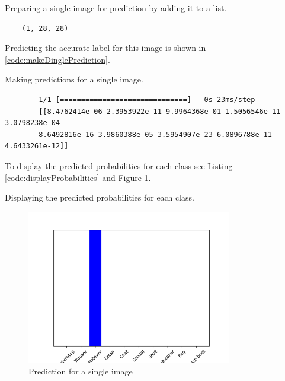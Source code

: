 \begin{code}[h!]
	    
	
	\caption{Preparing a single image for prediction by adding it to a list.}
	\label{code:prepareSingleImage}
\end{code}

\begin{verbatim}
	(1, 28, 28)
\end{verbatim}

Predicting the accurate label for this image is shown in \ref{code:makeDinglePrediction}.

\begin{code}[h!]
	    
	
	\caption{Making predictions for a single image.}
	\label{code:makeDinglePrediction}
\end{code}

{\footnotesize
	\begin{verbatim}
		1/1 [==============================] - 0s 23ms/step
		[[8.4762414e-06 2.3953922e-11 9.9964368e-01 1.5056546e-11 3.0798238e-04
		8.6492816e-16 3.9860388e-05 3.5954907e-23 6.0896788e-11 4.6433261e-12]]
	\end{verbatim}
}

To display the predicted probabilities for each class see Listing \ref{code:displayProbabilities} and Figure \ref{fig:singlePredictionPlot}.

\begin{code}[h!]
	    
	
	\caption{Displaying the predicted probabilities for each class.}
	\label{code:displayProbabilities}
\end{code}

\begin{figure}[h!]
	\centering
	\includegraphics[width=0.8\textwidth]{Images/TensorFlowPackage/singlePredictionPlot}
	\caption{Prediction for a single image} \label{fig:singlePredictionPlot}
\end{figure}

